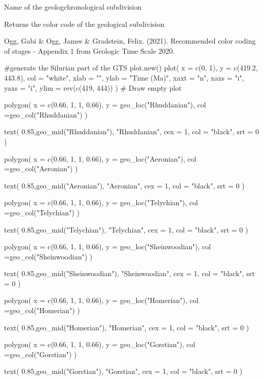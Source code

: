 \documentclass[a4paper]{book}
\begin{document}
%
\begin{Arguments}
\begin{ldescription}
\item[\code{name}] Name of the geologchronological subdivision
\end{ldescription}
\end{Arguments}
%
\begin{Value}
Returns the color code of the geological subdivision
\end{Value}
%
\begin{References}
Ogg, Gabi \& Ogg, James \& Gradstein, Felix. (2021).
Recommended color coding of stages - Appendix 1
from Geologic Time Scale 2020.
\end{References}
%
\begin{Examples}
\begin{ExampleCode}
#generate the Silurian part of the GTS
plot.new()
plot(
 x = c(0, 1),
 y = c(419.2, 443.8),
 col = "white",
 xlab = "",
 ylab = "Time (Ma)",
 xaxt = "n",
 xaxs = "i",
 yaxs = "i",
 ylim = rev(c(419, 444))
)            # Draw empty plot

polygon(
 x = c(0.66, 1, 1, 0.66),
 y = geo_loc("Rhuddanian"),
 col =geo_col("Rhuddanian")
)

text(
 0.85,geo_mid("Rhuddanian"),
 "Rhuddanian",
 cex = 1,
 col = "black",
 srt = 0
)

polygon(
 x = c(0.66, 1, 1, 0.66),
 y = geo_loc("Aeronian"),
 col =geo_col("Aeronian")
)

text(
 0.85,geo_mid("Aeronian"),
 "Aeronian",
 cex = 1,
 col = "black",
 srt = 0
)

polygon(
 x = c(0.66, 1, 1, 0.66),
 y = geo_loc("Telychian"),
 col =geo_col("Telychian")
)

text(
 0.85,geo_mid("Telychian"),
 "Telychian",
 cex = 1,
 col = "black",
 srt = 0
)

polygon(
 x = c(0.66, 1, 1, 0.66),
 y = geo_loc("Sheinwoodian"),
 col =geo_col("Sheinwoodian")
)

text(
 0.85,geo_mid("Sheinwoodian"),
 "Sheinwoodian",
 cex = 1,
 col = "black",
 srt = 0
)


polygon(
 x = c(0.66, 1, 1, 0.66),
 y = geo_loc("Homerian"),
 col =geo_col("Homerian")
)

text(
 0.85,geo_mid("Homerian"),
 "Homerian",
 cex = 1,
 col = "black",
 srt = 0
)


polygon(
 x = c(0.66, 1, 1, 0.66),
 y = geo_loc("Gorstian"),
 col =geo_col("Gorstian")
)

text(
 0.85,geo_mid("Gorstian"),
 "Gorstian",
 cex = 1,
 col = "black",
 srt = 0
)


\end{ExampleCode}
\end{Examples}
\end{document}
